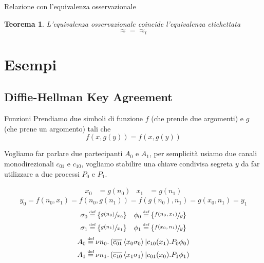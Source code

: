 \documentclass{beamer}
\newcounter{counter1}
\theoremstyle{plain}
\newtheorem{myteo}[counter1]{Teorema}
\theoremstyle{definition}
\theoremstyle{remark}
\newcommand{\obar}[1]{\overline{#1}}
\newcommand{\set}[1]{\left\{#1\right\}}
\newcommand{\pa}[1]{\left(#1\right)}
\newcommand{\ang}[1]{\left<#1\right>}
\newcommand*{\eqdef}{\ensuremath{\overset{\mathclap{\text{\tiny def}}}{=}}}
\begin{document}
\begin{frame}{Relazione con l'equivalenza osservazionale}
  \begin{myteo}
    L'equivalenza osservazionale coincide l'equivalenza etichettata
    \[ \approx = \approx _l \]
  \end{myteo}
\end{frame}

\section{Esempi}

\subsection{Diffie-Hellman Key Agreement}

\begin{frame}{Funzioni}
  Prendiamo due simboli di funzione $f$ (che prende due argomenti) e
  $g$ (che prene un argomento) tali che
  \[ f\pa{x,g(y)} = f\pa{x,g(y)} \]
  \vfill

  Vogliamo far parlare due partecipanti $A_0$ e $A_1$, per
  semplicit\`a usiamo due canali monodirezionali $c_{01}$ e $c_{10}$,
  vogliamo stabilire una chiave condivisa segreta $y$ da far
  utilizzare a due processi $P_0$ e $P_1$.
\end{frame}

\begin{frame}
  \begin{align*}
    x_0 &= g(n_0) & x_1 &=g(n_1)
  \end{align*}
  \[ y_0 = f(n_0,x_1) = f(n_0,g(n_1)) = f(g(n_0),n_1) = g(x_0,n_1) = y_1 \]
  \begin{align*}
    \sigma _0 & \eqdef \set{\sfrac{g(n_0)}{x_0}} & \phi _0 & \eqdef
                                                             \set{\sfrac{
                                                             f(n_0,x_1)}{y}} \\
    \sigma _1 & \eqdef \set{\sfrac{g(n_1)}{x_1}} & \phi _1 & \eqdef
                                                             \set{\sfrac{
                                                             f(x_0,n_1)}{y}} 
  \end{align*}
  \begin{align*}
    A_0 &\eqdef \nu n_0.\pa{ \obar{c_{01}}\ang{x_0\sigma _0} |
          c_{10}(x_1).P_0\phi _0 } \\
    A_1 &\eqdef \nu n_1.\pa{ \obar{c_{10}}\ang{x_1\sigma _1} |
          c_{01}(x_0).P_1\phi _1 }
  \end{align*}
\end{frame}
\end{document}
